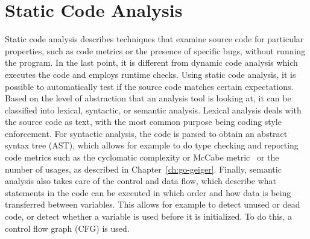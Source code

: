 
\section{Static Code Analysis}\label{sec:background:static-code-analysis}

Static code analysis describes techniques that examine source code for particular properties, such as code metrics or
the presence of specific bugs, without running the program.
In the last point, it is different from dynamic code analysis which executes the code and employs runtime checks.
Using static code analysis, it is possible to automatically test if the source code matches certain expectations.
Based on the level of abstraction that an analysis tool is looking at, it can be classified into lexical, syntactic,
or semantic analysis.
Lexical analysis deals with the source code as text, with the most common purpose being coding style enforcement.
For syntactic analysis, the code is parsed to obtain an abstract syntax tree (\acrshort{AST}), which allows for example
to do type checking and reporting code metrics such as the cyclomatic complexity or McCabe metric~\cite{watson1996} or
the number of \unsafe{} usages, as described in Chapter~\ref{ch:go-geiger}.
Finally, semantic analysis also takes care of the control and data flow, which describe what statements in the code can
be executed in which order and how data is being transferred between variables.
This allows for example to detect unused or dead code, or detect whether a variable is used before it is initialized.
To do this, a control flow graph (\acrshort{CFG}) is used.

